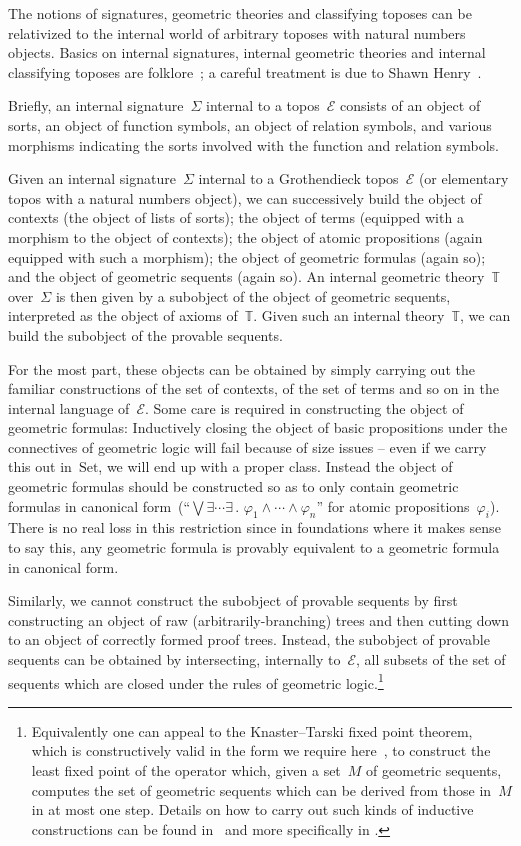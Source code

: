 \documentclass[oneside,reqno]{amsart}
\theoremstyle{definition}
\theoremstyle{plain}
\theoremstyle{remark}
\newcommand{\E}{\mathcal{E}}
\newcommand{\TT}{\mathbb{T}}
\newcommand{\Set}{\mathrm{Set}}
\renewcommand{\_}{\mathpunct{.}\,}
\newcommand{\?}{\,{:}\,}
\begin{document}
The notions of signatures, geometric theories and classifying toposes can be
relativized to the internal world of arbitrary toposes with natural numbers
objects. Basics on internal signatures, internal geometric
theories and internal classifying toposes are
folklore~\cite[p.~334]{wraith:intuitionistic-algebra}; a careful treatment is
due to Shawn Henry~\cite{henry:phd}.

Briefly, an internal signature~$\Sigma$ internal to a topos~$\E$ consists of an
object of sorts, an object of function symbols, an object of relation symbols,
and various morphisms indicating the sorts involved with the function and
relation symbols.

Given an internal signature~$\Sigma$ internal to a Grothendieck topos~$\E$ (or
elementary topos with a natural numbers object), we can successively build the
object of contexts (the object of lists of sorts); the object of terms
(equipped with a morphism to the object of contexts); the object of atomic
propositions (again equipped with such a morphism); the object of geometric
formulas (again so); and the object of geometric sequents (again so). An internal
geometric theory~$\TT$ over~$\Sigma$ is then given by a subobject of the object
of geometric sequents, interpreted as the object of axioms of~$\TT$.
Given such an internal theory~$\TT$, we can build the subobject of the provable
sequents.

For the most part, these objects can be obtained by simply carrying out the
familiar constructions of the set of contexts, of the set of terms and so on in
the internal language of~$\E$. Some care is required in constructing the
object of geometric formulas: Inductively closing the object of basic
propositions under the connectives of geometric logic will fail because of size
issues -- even if we carry this out in~$\Set$, we will end up with a proper
class. Instead the object of geometric formulas should be constructed so as to
only contain geometric formulas in canonical form~(``$\bigvee \exists \cdots
\exists\_ \varphi_1 \wedge \cdots \wedge \varphi_n$'' for atomic
propositions~$\varphi_i$). There is no real loss in this restriction since in
foundations where it makes sense to say this, any geometric formula is provably
equivalent to a geometric formula in canonical form.

Similarly, we cannot construct the subobject of provable sequents by first
constructing an object of raw (arbitrarily-branching) trees and then cutting
down to an object of correctly formed proof trees. Instead, the subobject of
provable sequents can be obtained by intersecting, internally to~$\E$, all
subsets of the set of sequents which are closed under the rules of geometric
logic.\footnote{Equivalently one can appeal to the Knaster--Tarski fixed point
theorem, which is constructively valid in the form we require
here~\cite{bauer-lumsdaine:bourbaki-witt}, to construct the least fixed point
of the operator which, given a set~$M$ of geometric sequents, computes the set of
geometric sequents which can be derived from those in~$M$ in at most one step.
Details on how to carry out such kinds of inductive constructions can be found
in~\cite{blass:induction} and more specifically in
\cite[Chapter~III]{henry:phd}.}
\end{document}
